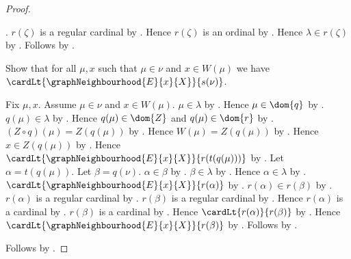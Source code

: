 \begin{proof}
\begin{subproof}
\begin{subproof}
\begin{byCase}
                        .
                    $r(\zeta)$ is a regular cardinal by
                        .
                    Hence $r(\zeta)$ is an ordinal by
                        .
                    Hence $\lambda\in r(\zeta)$ by
                        .
                    Follows by \auto.
            \end{byCase}
        \end{subproof}
        Show that for all $\mu,x$ such that $\mu\in\nu$ and
            $x\in W(\mu)$ we have
            $\cardLt{\graphNeighbourhood{E}{x}{X}}{s(\nu)}$.
        \begin{subproof}
            Fix $\mu,x$.
            Assume $\mu\in\nu$ and $x\in W(\mu)$.
            $\mu\in\lambda$ by .
            Hence $\mu\in\dom{q}$ by \auto.
            $q(\mu)\in\lambda$ by .
            Hence $q(\mu)\in\dom{Z}$ and $q(\mu)\in\dom{r}$ by
                \auto.
            $(Z\circ q)(\mu)=Z(q(\mu))$ by .
            Hence $W(\mu)=Z(q(\mu))$ by \auto.
            Hence $x\in Z(q(\mu))$ by \auto.
            Hence $\cardLt{\graphNeighbourhood{E}{x}{X}}
                {r(t(q(\mu)))}$ by \auto.
            Let $\alpha=t(q(\mu))$.
            Let $\beta=q(\nu)$.
            $\alpha\in\beta$ by \auto.
            $\beta\in\lambda$ by \auto.
            Hence $\alpha\in\lambda$ by
                .
            $\cardLt{\graphNeighbourhood{E}{x}{X}}{r(\alpha)}$ by
                \auto.
            $r(\alpha)\in r(\beta)$ by
                .
            $r(\alpha)$ is a regular cardinal by
                .
            $r(\beta)$ is a regular cardinal by
                .
            Hence $r(\alpha)$ is a cardinal by
                .
            $r(\beta)$ is a cardinal by
                .
            Hence $\cardLt{r(\alpha)}{r(\beta)}$ by
                .
            Hence $\cardLt{\graphNeighbourhood{E}{x}{X}}{r(\beta)}$ by
                .
            Follows by \auto.
        \end{subproof}
    \end{subproof}
    Follows by \auto.
\end{proof}

